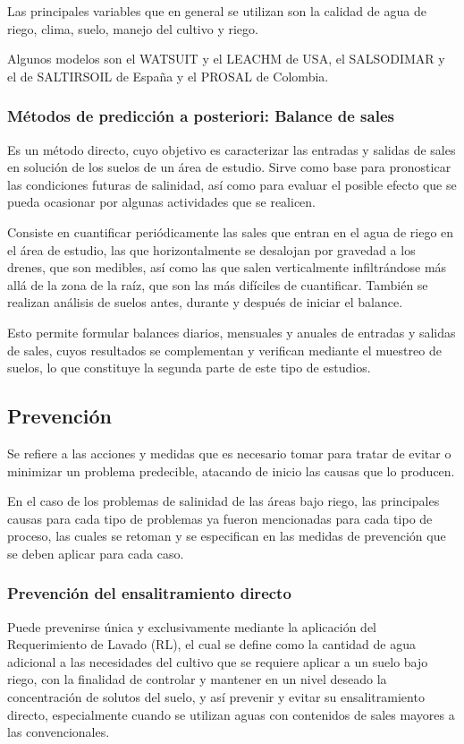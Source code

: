 Las principales variables que en general se utilizan son la calidad de agua de riego, clima, suelo, manejo del cultivo y riego.

Algunos modelos son el WATSUIT y el LEACHM de USA, el SALSODIMAR y el de SALTIRSOIL de España y el PROSAL de Colombia.

\subsubsection{Métodos de predicción a posteriori: Balance de sales}
Es un método directo, cuyo objetivo es caracterizar las entradas y salidas de sales en solución de los suelos de un área de estudio. Sirve como base para pronosticar las condiciones futuras de salinidad, así como para evaluar el posible efecto que se pueda ocasionar por algunas actividades que se realicen.

Consiste en cuantificar periódicamente las sales que entran en el agua de riego en el área de estudio, las que horizontalmente se desalojan por gravedad a los drenes, que son medibles, así como las que salen verticalmente infiltrándose más allá de la zona de la raíz, que son las más difíciles de cuantificar. También se realizan análisis de suelos antes, durante y después de iniciar el balance.

Esto permite formular balances diarios, mensuales y anuales de entradas y salidas de sales, cuyos resultados se complementan y verifican mediante el muestreo de suelos, lo que constituye la segunda parte de este tipo de estudios.
\subsection{Prevención}
Se refiere a las acciones y medidas que es necesario tomar para tratar de evitar o minimizar un problema predecible, atacando de inicio las causas que lo producen.

En el caso de los problemas de salinidad de las áreas bajo riego, las principales causas para cada tipo de problemas ya fueron mencionadas para cada tipo de proceso, las cuales se retoman y se especifican en las medidas de prevención que se deben aplicar para cada caso.
\subsubsection{Prevención del ensalitramiento directo}
Puede prevenirse única y exclusivamente mediante la aplicación del Requerimiento de Lavado (RL), el cual se define como la cantidad de agua adicional a las necesidades del cultivo que se requiere aplicar a un suelo bajo riego, con la finalidad de controlar y mantener en un nivel deseado la concentración de solutos del suelo, y así prevenir y evitar su ensalitramiento directo, especialmente cuando se utilizan aguas con contenidos de sales mayores a las convencionales. 

